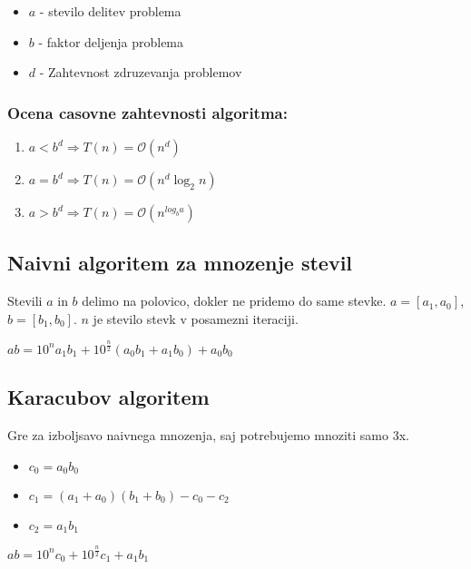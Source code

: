 \documentclass{article}
\begin{document}
\begin{multicols}{2}
\begin{itemize}
    \item $a$ - stevilo delitev problema
    \item $b$ - faktor deljenja problema
    \item $d$ - Zahtevnost zdruzevanja problemov 
\end{itemize}

\subsubsection{Ocena casovne zahtevnosti algoritma:}
\begin{enumerate}
    \item $a < b^d \Rightarrow T(n) = \mathcal{O}(n^d)$
    \item $a = b^d \Rightarrow T(n) = \mathcal{O}(n^d \log_2 n)$
    \item $a > b^d \Rightarrow T(n) = \mathcal{O}(n^{log_b a})$
\end{enumerate}

\subsection{Naivni algoritem za mnozenje stevil}
Stevili $a$ in $b$ delimo na polovico, dokler ne pridemo do same stevke.
$a = [a_1, a_0]$, $b =[b_1, b_0]$. $n$ je stevilo stevk v posamezni iteraciji.

\begin{center}
    \begin{math}
        ab = 10^n a_1 b_1 + 10^{\frac{n}{2}}(a_0 b_1 + a_1 b_0) + a_0 b_0
    \end{math}
\end{center}

\subsection{Karacubov algoritem}
Gre za izboljsavo naivnega mnozenja, saj potrebujemo mnoziti samo 3x.
\begin{itemize}
    \item $c_0 = a_0 b_0$
    \item $c_1 = (a_1 + a_0) (b_1 + b_0) - c_0 - c_2$
    \item $c_2 = a_1 b_1$
\end{itemize}

\begin{center}
    \begin{math}
        ab = 10^n c_0 + 10^{\frac{n}{2}} c_1 + a_1 b_1
    \end{math}
\end{center}


\end{multicols}
\end{document}
